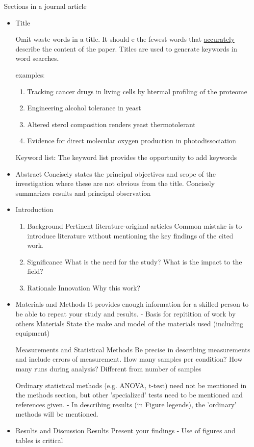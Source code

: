 \documentclass{article}
\begin{document}
\begin{section}{Sections in a journal article}
	\begin{itemize}
		\item Title
			
			Omit waste words in a title. It should e the fewest words that \underline{accurately} describe the content of the paper. Titles are used to generate keywords in word searches.

			examples:
			\begin{enumerate}
				\item Tracking cancer drugs in living cells by htermal profiling of the proteome
				\item Engineering alcohol tolerance in yeast
				\item Altered sterol composition renders yeast thermotolerant
				\item Evidence for direct molecular oxygen production in  photodissociation
			\end{enumerate}
			Keyword list: The keyword list provides the opportunity to add keywords
		\item Abstract
			Concisely states the principal objectives and scope of the investigation where these are not obvious from the title.
			Concisely summarizes results and principal observation
		\item Introduction
			\begin{enumerate}
				\item Background
					Pertinent literature-original articles
					Common mistake is to introduce literature without mentioning the key findings of the cited work.
				\item Significance
					What is the need for the study? 
					What is the impact to the field?
				\item Rationale
					Innovation
					Why this work?
			\end{enumerate}
		\item Materials and Methods
			It provides enough information for a skilled person to be able to repeat your study and results.
			- Basis for repitition of work by others
			Materials
			State the make and model of the materials used (including equipment)

			Measurements and Statistical Methods
			Be precise in describing measurements and include errors of measurement.
			How many samples per condition?
			How many runs during analysis? Different from number of samples

			Ordinary statistical methods (e.g. ANOVA, t-test) need not be mentioned in the methods section, but other 'specialized' tests need to be mentioned and references given.
			- In describing results (in Figure legends), the 'ordinary' methods will be mentioned.
		\item Results and Discussion
			Results
			Present your findings
			- Use of figures and tables is critical


\end{itemize}
\end{section}
\end{document}
